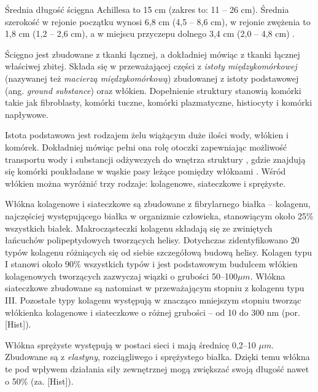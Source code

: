 Średnia długość ścięgna Achillesa to 15 cm (zakres to: 11 -- 26 cm). Średnia szerokość w rejonie początku wynosi 6,8 cm (4,5 -- 8,6 cm), w rejonie zwężenia to 1,8 cm (1,2 -- 2,6 cm), a w miejscu przyczepu dolnego 3,4 cm (2,0 -- 4,8 cm) \cite{Doral2010, KoivunenNiemel1995}.

Ścięgno jest zbudowane z tkanki łącznej, a dokładniej mówiąc z tkanki łącznej właściwej zbitej. Składa się w przeważającej części z \textit{istoty międzykomórkowej} (nazywanej też \textit{macierzą międzykomórkową}) zbudowanej z istoty podstawowej (ang. \textit{ground substance}) oraz włókien. Dopełnienie struktury stanowią komórki takie jak fibroblasty, komórki tuczne, komórki plazmatyczne, histiocyty i komórki napływowe. 

Istota podstawowa jest rodzajem żelu wiążącym duże ilości wody, włókien i komórek. Dokładniej mówiąc pełni ona rolę otoczki zapewniając możliwość transportu wody i substancji odżywczych do wnętrza struktury \cite{Sharma2006}, gdzie znajdują się komórki poukładane w wąskie pasy leżące pomiędzy włóknami \cite{Maffulli2005}. Wśród włókien można wyróżnić trzy rodzaje: kolagenowe, siateczkowe i sprężyste.

Włókna kolagenowe i siateczkowe są zbudowane z fibrylarnego białka -- kolagenu, najczęściej występującego białka w organizmie człowieka, stanowiącym około 25\% wszystkich białek. Makrocząsteczki kolagenu składają się ze zwiniętych łańcuchów polipeptydowych tworzących helisy. Dotychczas zidentyfikowano 20 typów kolagenu różniących się od siebie szczegółową budową helisy. Kolagen typu I stanowi około 90\% wszystkich typów i jest podstawowym budulcem włókien kolagenowych tworzących zazwyczaj wiązki o grubości 50--100$\mu$$m$. Włókna siateczkowe zbudowane są natomiast w przeważającym stopniu z kolagenu typu III. Pozostałe typy kolagenu występują w znacząco mniejszym stopniu tworząc włókienka kolagenowe i siateczkowe o różnej grubości -- od 10 do 300 nm (por. [Hist]).

Włókna sprężyste występują w postaci sieci i mają średnicę 0,2--10 $\mu$$m$. Zbudowane są z \textit{elastyny}, rozciągliwego i sprężystego białka. Dzięki temu włókna te pod wpływem działania siły zewnętrznej mogą zwiększać swoją długość nawet o 50\% (za. [Hist]). 

